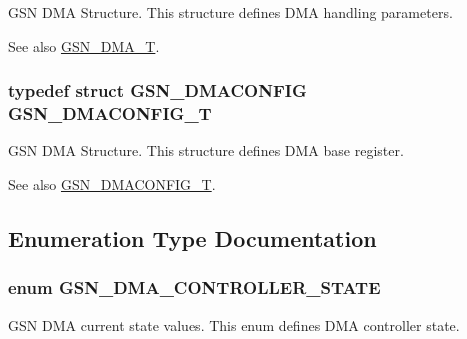 GSN DMA Structure. This structure defines DMA handling parameters. 

\begin{DoxySeeAlso}{See also}
\hyperlink{a00645_ga61edafecbc46e3ba81ec48b9cf3aa1fa}{GSN\_\-DMA\_\-T}. 
\end{DoxySeeAlso}
\hypertarget{a00645_ga64a1083039794c33e6a904f799f730c5}{
\subsubsection[{GSN\_\-DMACONFIG\_\-T}]{\setlength{\rightskip}{0pt plus 5cm}typedef struct {\bf GSN\_\-DMACONFIG} {\bf GSN\_\-DMACONFIG\_\-T}}}
\label{a00645_ga64a1083039794c33e6a904f799f730c5}


GSN DMA Structure. This structure defines DMA base register. 

\begin{DoxySeeAlso}{See also}
\hyperlink{a00645_ga64a1083039794c33e6a904f799f730c5}{GSN\_\-DMACONFIG\_\-T}. 
\end{DoxySeeAlso}


\subsection{Enumeration Type Documentation}
\hypertarget{a00645_gae429fb6067bac27636298d334042de5f}{
\subsubsection[{GSN\_\-DMA\_\-CONTROLLER\_\-STATE}]{\setlength{\rightskip}{0pt plus 5cm}enum {\bf GSN\_\-DMA\_\-CONTROLLER\_\-STATE}}}
\label{a00645_gae429fb6067bac27636298d334042de5f}


GSN DMA current state values. This enum defines DMA controller state. 

